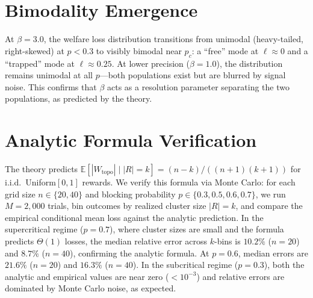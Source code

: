 \documentclass[12pt]{article}
\newcommand{\E}{\mathbb{E}}
\newcommand{\Wtopo}{W_{\mathrm{topo}}}
\begin{document}
\section{Bimodality Emergence}

At $\beta = 3.0$, the welfare loss distribution transitions from unimodal (heavy-tailed, right-skewed) at $p < 0.3$ to visibly bimodal near $p_c$: a ``free'' mode at $\ell \approx 0$ and a ``trapped'' mode at $\ell \approx 0.25$. At lower precision ($\beta = 1.0$), the distribution remains unimodal at all $p$---both populations exist but are blurred by signal noise. This confirms that $\beta$ acts as a resolution parameter separating the two populations, as predicted by the theory.

\section{Analytic Formula Verification}

The theory predicts $\E[|\Wtopo| \mid |R| = k] = (n-k)/((n+1)(k+1))$ for i.i.d.\ Uniform$[0,1]$ rewards. We verify this formula via Monte Carlo: for each grid size $n \in \{20, 40\}$ and blocking probability $p \in \{0.3, 0.5, 0.6, 0.7\}$, we run $M = 2{,}000$ trials, bin outcomes by realized cluster size $|R| = k$, and compare the empirical conditional mean loss against the analytic prediction. In the supercritical regime ($p = 0.7$), where cluster sizes are small and the formula predicts $\Theta(1)$ losses, the median relative error across $k$-bins is $10.2\%$ ($n=20$) and $8.7\%$ ($n=40$), confirming the analytic formula. At $p = 0.6$, median errors are $21.6\%$ ($n=20$) and $16.3\%$ ($n=40$). In the subcritical regime ($p = 0.3$), both the analytic and empirical values are near zero ($<10^{-3}$) and relative errors are dominated by Monte Carlo noise, as expected.
\end{document}
